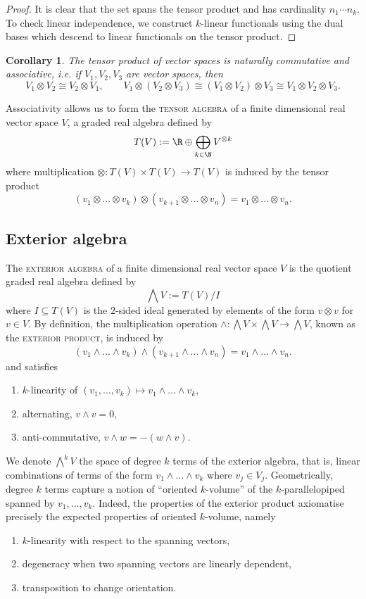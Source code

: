 \documentclass[reqno]{amsart}
\newtheorem{corollary}[theorem]{Corollary}
\theoremstyle{definition}
\theoremstyle{remark}
\renewcommand{\emph}{\textsc}
\begin{document}
\begin{proof}
	It is clear that the set spans the tensor product and has cardinality $n_1 \cdots n_k$. To check linear independence, we construct $k$-linear functionals using the dual bases which descend to linear functionals on the tensor product. 
\end{proof}

\begin{corollary}
	 The tensor product of vector spaces is naturally commutative and associative, i.e. if $V_1, V_2, V_3$ are vector spaces, then
	\[ V_1 \otimes V_2 \cong V_2 \otimes V_1, \qquad V_1 \otimes (V_2 \otimes V_3) \cong (V_1 \otimes V_2) \otimes V_3 \cong V_1 \otimes V_2 \otimes V_3.  \]
\end{corollary}

	Associativity allows us to form the \emph{tensor algebra} of a finite dimensional real vector space $V$, a graded real algebra defined by 
	\[ T(V) := \R \oplus \bigoplus_{k \in \N} V^{\otimes k} \]
	where multiplication $\otimes : T(V) \times T(V) \to T(V)$ is induced by the tensor product
		\[ (v_1 \otimes \dots \otimes v_k) \otimes (v_{k + 1} \otimes \dots \otimes v_n) = v_1 \otimes \dots \otimes v_n. \]

\subsection{Exterior algebra}

The \emph{exterior algebra} of a finite dimensional real vector space $V$ is the quotient graded real algebra defined by 
	\[ \bigwedge V := T(V) / I \]
where $I \subseteq T(V)$ is the $2$-sided ideal generated by elements of the form $v \otimes v$ for $v \in V$. By definition, the multiplication operation $\wedge : \bigwedge V \times \bigwedge V \to \bigwedge V$, known as the \emph{exterior product}, is induced by 
		\[ (v_1 \wedge \dots \wedge v_k) \wedge (v_{k + 1} \wedge \dots \wedge v_n) = v_1 \wedge \dots \wedge v_n. \]
and satisfies
\begin{enumerate}
	\item $k$-linearity of $(v_1, \dots, v_k) \mapsto v_1 \wedge \dots \wedge v_k$,
	\item alternating, $v \wedge v = 0$, 
	\item anti-commutative, $v \wedge w = -  (w \wedge v)$.
\end{enumerate}
We denote $\bigwedge^k V$ the space of degree $k$ terms of the exterior algebra, that is, linear combinations of terms of the form $v_1 \wedge \dots \wedge v_k$ where $v_j \in V_j$. Geometrically, degree $k$ terms capture a notion of ``oriented $k$-volume'' of the $k$-parallelopiped spanned by $v_1, \dots, v_k$. Indeed, the properties of the exterior product axiomatise precisely the expected properties of oriented $k$-volume, namely
\begin{enumerate}
	\item $k$-linearity with respect to the spanning vectors,
	\item degeneracy when two spanning vectors are linearly dependent,
	\item transposition to change orientation.
\end{enumerate}
\end{document}
